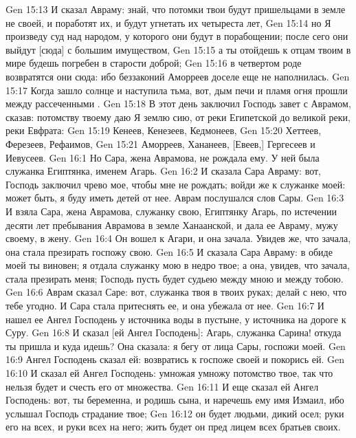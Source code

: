 \vs Gen 15:13 И сказал  Авраму: знай, что потомки твои будут пришельцами в земле не своей, и поработят их, и будут угнетать их четыреста лет,
\vs Gen 15:14 но Я произведу суд над народом, у которого они будут в порабощении; после сего они выйдут [сюда] с большим имуществом,
\vs Gen 15:15 а ты отойдешь к отцам твоим в мире  будешь погребен в старости доброй;
\vs Gen 15:16 в четвертом роде возвратятся они сюда: ибо  беззаконий Аморреев доселе еще не наполнилась.
\vs Gen 15:17 Когда зашло солнце и наступила тьма, вот, дым  печи и пламя огня прошли между рассеченными .
\vs Gen 15:18 В этот день заключил Господь завет с Аврамом, сказав: потомству твоему даю Я землю сию, от реки Египетской до великой реки, реки Евфрата:
\vs Gen 15:19 Кенеев, Кенезеев, Кедмонеев,
\vs Gen 15:20 Хеттеев, Ферезеев, Рефаимов,
\vs Gen 15:21 Аморреев, Хананеев, [Евеев,] Гергесеев и Иевусеев.
\vs Gen 16:1 Но Сара, жена Аврамова, не рождала ему. У ней была служанка Египтянка, именем Агарь.
\vs Gen 16:2 И сказала Сара Авраму: вот, Господь заключил чрево мое, чтобы мне не рождать; войди же к служанке моей: может быть, я буду иметь детей от нее. Аврам послушался слов Сары.
\vs Gen 16:3 И взяла Сара, жена Аврамова, служанку свою, Египтянку Агарь, по истечении десяти лет пребывания Аврамова в земле Ханаанской, и дала ее Авраму, мужу своему, в жену.
\vs Gen 16:4 Он вошел к Агари, и она зачала. Увидев же, что зачала, она стала презирать госпожу свою.
\vs Gen 16:5 И сказала Сара Авраму: в обиде моей ты виновен; я отдала служанку мою в недро твое; а она, увидев, что зачала, стала презирать меня; Господь пусть будет судьею между мною и между тобою.
\vs Gen 16:6 Аврам сказал Саре: вот, служанка твоя в твоих руках; делай с нею, что тебе угодно. И Сара стала притеснять ее, и она убежала от нее.
\vs Gen 16:7 И нашел ее Ангел Господень у источника воды в пустыне, у источника на дороге к Суру.
\vs Gen 16:8 И сказал [ей Ангел Господень]: Агарь, служанка Сарина! откуда ты пришла и куда идешь? Она сказала: я бегу от лица Сары, госпожи моей.
\vs Gen 16:9 Ангел Господень сказал ей: возвратись к госпоже своей и покорись ей.
\vs Gen 16:10 И сказал ей Ангел Господень: умножая умножу потомство твое, так что нельзя будет и счесть его от множества.
\vs Gen 16:11 И еще сказал ей Ангел Господень: вот, ты беременна, и родишь сына, и наречешь ему имя Измаил, ибо услышал Господь страдание твое;
\vs Gen 16:12 он будет  людьми,  дикий осел; руки его на всех, и руки всех на него; жить будет он пред лицем всех братьев своих.
